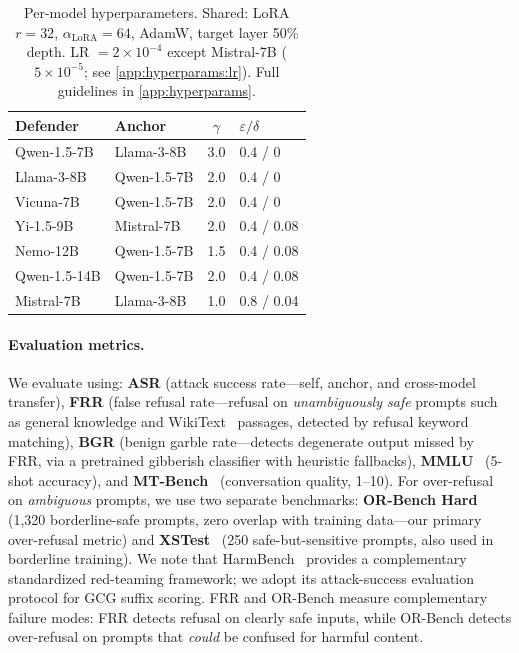 \begin{table}[ht]
\centering
\caption{Per-model hyperparameters. Shared: LoRA $r\!=\!32$, $\alpha_{\text{LoRA}}\!=\!64$, AdamW, target layer 50\% depth. LR $= 2\!\times\!10^{-4}$ except Mistral-7B ($5\!\times\!10^{-5}$; see \cref{app:hyperparams:lr}). Full guidelines in \cref{app:hyperparams}.}
\label{tab:hyperparams_permodel}
\setlength{\tabcolsep}{4pt}
\begin{tabular}{@{}llcl@{}}
\toprule
\textbf{Defender} & \textbf{Anchor} & \textbf{$\gamma$} & \textbf{$\varepsilon / \delta$} \\
\midrule
Qwen-1.5-7B    & Llama-3-8B   & 3.0 & 0.4 / 0    \\
Llama-3-8B     & Qwen-1.5-7B  & 2.0 & 0.4 / 0    \\
Vicuna-7B      & Qwen-1.5-7B  & 2.0 & 0.4 / 0    \\
Yi-1.5-9B      & Mistral-7B   & 2.0 & 0.4 / 0.08 \\
Nemo-12B       & Qwen-1.5-7B  & 1.5 & 0.4 / 0.08 \\
Qwen-1.5-14B   & Qwen-1.5-7B  & 2.0 & 0.4 / 0.08 \\
Mistral-7B     & Llama-3-8B   & 1.0 & 0.8 / 0.04 \\
\bottomrule
\end{tabular}
\setlength{\tabcolsep}{6pt}
\end{table}

\paragraph{Evaluation metrics.}
We evaluate using: \textbf{ASR} (attack success rate---self, anchor, and cross-model transfer), \textbf{FRR} (false refusal rate---refusal on \emph{unambiguously safe} prompts such as general knowledge and WikiText~\citep{wikitext} passages, detected by refusal keyword matching), \textbf{BGR} (benign garble rate---detects degenerate output missed by FRR, via a pretrained gibberish classifier with heuristic fallbacks), \textbf{MMLU}~\citep{mmlu} (5-shot accuracy), and \textbf{MT-Bench}~\citep{mtbench} (conversation quality, 1--10). For over-refusal on \emph{ambiguous} prompts, we use two separate benchmarks: \textbf{OR-Bench Hard}~\citep{orbench} (1,320 borderline-safe prompts, zero overlap with training data---our primary over-refusal metric) and \textbf{XSTest}~\citep{xstest} (250 safe-but-sensitive prompts, also used in borderline training). We note that HarmBench~\citep{harmbench} provides a complementary standardized red-teaming framework; we adopt its attack-success evaluation protocol for GCG suffix scoring. FRR and OR-Bench measure complementary failure modes: FRR detects refusal on clearly safe inputs, while OR-Bench detects over-refusal on prompts that \emph{could} be confused for harmful content.

